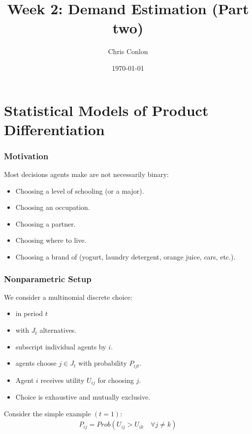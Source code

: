 \documentclass[xcolor=pdftex,dvipsnames,table,mathserif]{beamer}
\begin{document}
\title{Week 2: Demand Estimation (Part two)}
\author{Chris Conlon}
\date{\today}

\frame{\titlepage}


\section{Statistical Models of Product Differentiation}
\begin{frame}
\frametitle{Motivation}
Most decisions agents make are not necessarily binary:
\begin{itemize}
\item Choosing a level of schooling (or a major).
\item Choosing an occupation.
\item Choosing a partner.
\item Choosing where to live.
\item Choosing a brand of (yogurt, laundry detergent, orange juice, cars, etc.).
 \end{itemize}
\end{frame}

\begin{frame}
\frametitle{Nonparametric Setup}
We consider a \alert{multinomial discrete choice}:
\begin{itemize}
\item in period $t$
\item with $J_t$ alternatives.
\item subscript individual agents by $i$.
\item agents choose $j \in J_t$ with probability $P_{ijt}$.
\item Agent $i$ receives utility $U_{ij}$ for choosing $j$.
\item Choice is exhaustive and mutually exclusive.
 \end{itemize}\pause
Consider the simple example $(t=1)$:
\begin{eqnarray*}
P_{ij} = Prob( U_{ij} > U_{ik} \quad \forall j \neq k)
\end{eqnarray*}
\end{frame}
\end{document}
